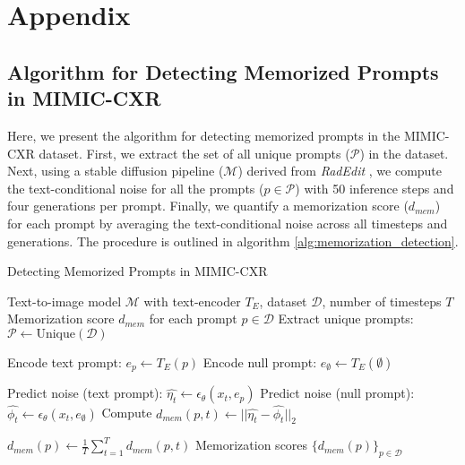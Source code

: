 \section{Appendix}

\subsection{Algorithm for Detecting Memorized Prompts in MIMIC-CXR}

Here, we present the algorithm for detecting memorized prompts in the MIMIC-CXR dataset. First, we extract the set of all unique prompts ($\mathcal{P}$) in the dataset. Next, using a stable diffusion pipeline ($\mathcal{M}$) derived from \textit{RadEdit} \cite{perez2024radedit}, we compute the text-conditional noise for all the prompts ($p \in \mathcal{P}$) with 50 inference steps and four generations per prompt. Finally, we quantify a memorization score ($d_{mem}$) for each prompt by averaging the text-conditional noise across all timesteps and generations. The procedure is outlined in algorithm \ref{alg:memorization_detection}.

\begin{algorithm}
\caption{Detecting Memorized Prompts in MIMIC-CXR}
\label{alg:memorization_detection}
\begin{algorithmic}[1]
\Require Text-to-image model $\mathcal{M}$ with text-encoder $T_E$, dataset $\mathcal{D}$, number of timesteps $T$
\Ensure Memorization score $d_{mem}$ for each prompt $p \in \mathcal{D}$
\State Extract unique prompts: $\mathcal{P} \leftarrow \text{Unique}(\mathcal{D})$

    \State Encode text prompt: $e_p \leftarrow T_E(p)$
    \State Encode null prompt: $e_{\emptyset} \leftarrow T_E(\emptyset)$
    
        \State Predict noise (text prompt): $\hat{\eta_t} \leftarrow \epsilon_{\theta}(x_t, e_p)$
        \State Predict noise (null prompt): $\hat{\phi_t} \leftarrow \epsilon_{\theta}(x_t, e_{\emptyset})$
        \State Compute $d_{mem}(p, t) \leftarrow ||\hat{\eta_t} - \hat{\phi_t}||_2$
    \EndFor

    \State $d_{mem}(p) \leftarrow \frac{1}{T} \sum_{t=1}^T d_{mem}(p,t)$
\EndFor
\State \Return Memorization scores $\{d_{mem}(p)\}_{p \in \mathcal{D}}$

\end{algorithmic}
\end{algorithm}

